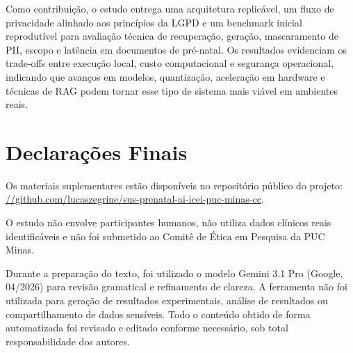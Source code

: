 \documentclass[12pt]{article}
\begin{document}

Como contribuição, o estudo entrega uma arquitetura replicável, um fluxo de privacidade alinhado aos princípios da LGPD e um benchmark inicial reprodutível para avaliação técnica de recuperação, geração, mascaramento de PII, escopo e latência em documentos de pré-natal.
Os resultados evidenciam os trade-offs entre execução local, custo computacional e segurança operacional, indicando que avanços em modelos, quantização, aceleração em hardware e técnicas de RAG podem tornar esse tipo de sistema mais viável em ambientes reais.


\section{Declarações Finais}


Os materiais suplementares estão disponíveis no repositório público do projeto: \href{https://github.com/lucaszegrine/sus-prenatal-ai-icei-puc-minas-cc}{//github.com/lucaszegrine/sus-prenatal-ai-icei-puc-minas-cc}.

O estudo não envolve participantes humanos, não utiliza dados clínicos reais identificáveis e não foi submetido ao Comitê de Ética em Pesquisa da PUC Minas. 

Durante a preparação do texto, foi utilizado o modelo Gemini 3.1 Pro (Google, 04/2026) para revisão gramatical e refinamento de clareza.
A ferramenta não foi utilizada para geração de resultados experimentais, análise de resultados ou compartilhamento de dados sensíveis.
Todo o conteúdo obtido de forma automatizada foi revisado e editado conforme necessário, sob total responsabilidade dos autores.
\end{document}
